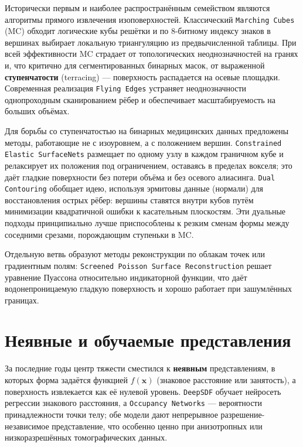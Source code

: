 \documentclass[a4paper,14pt]{article}
\begin{document}
Исторически первым и наиболее распространённым семейством являются алгоритмы прямого извлечения изоповерхностей. Классический \texttt{Marching Cubes} (MC) \cite{lorensen1987} обходит логические кубы решётки и по 8-битному индексу знаков в вершинах выбирает локальную триангуляцию из предвычисленной таблицы. При всей эффективности MC страдает от топологических неоднозначностей на гранях и, что критично для сегментированных бинарных масок, от выраженной \textbf{ступенчатости} (terracing) --- поверхность распадается на осевые площадки. Современная реализация \texttt{Flying Edges} \cite{schroeder2015} устраняет неоднозначности однопроходным сканированием рёбер и обеспечивает масштабируемость на больших объёмах.

Для борьбы со ступенчатостью на бинарных медицинских данных предложены методы, работающие не с изоуровнем, а с положением вершин. \texttt{Constrained Elastic SurfaceNets} \cite{gibson1998} размещает по одному узлу в каждом граничном кубе и релаксирует их положения под ограничением, оставаясь в пределах вокселя; это даёт гладкие поверхности без потери объёма и без осевого алиасинга. \texttt{Dual Contouring} \cite{ju2002} обобщает идею, используя эрмитовы данные (нормали) для восстановления острых рёбер: вершины ставятся внутри кубов путём минимизации квадратичной ошибки к касательным плоскостям. Эти дуальные подходы принципиально лучше приспособлены к резким сменам формы между соседними срезами, порождающим ступеньки в MC.

Отдельную ветвь образуют методы реконструкции по облакам точек или градиентным полям: \texttt{Screened Poisson Surface Reconstruction} \cite{kazhdan2013} решает уравнение Пуассона относительно индикаторной функции, что даёт водонепроницаемую гладкую поверхность и хорошо работает при зашумлённых границах.

\section{Неявные и обучаемые представления}

За последние годы центр тяжести сместился к \textbf{неявным} представлениям, в которых форма задаётся функцией $f(\mathbf{x})$ (знаковое расстояние или занятость), а поверхность извлекается как её нулевой уровень. \texttt{DeepSDF} \cite{park2019} обучает нейросеть регрессии знакового расстояния, а \texttt{Occupancy Networks} \cite{mescheder2019} --- вероятности принадлежности точки телу; обе модели дают непрерывное разрешение-независимое представление, что особенно ценно при анизотропных или низкоразрешённых томографических данных.
\end{document}
